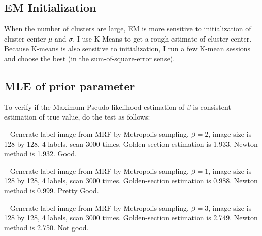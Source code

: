 \documentclass{article}
\begin{document}
\subsection{EM Initialization}
When the number of clusters are large, EM is more sensitive to initialization of cluster center $\mu$ and $\sigma$. I use K-Means to get a rough estimate of cluster center. Because K-means is also sensitive to initialization, I run a few K-mean sessions and choose the best (in the sum-of-square-error sense).

\subsection{MLE of prior parameter}
To verify if the Maximum  Pseudo-likelihood estimation of $\beta$ is consistent estimation of true value, do the test as follows:

-- Generate label image from MRF by Metropolis sampling. $\beta = 2$, image size is 128 by 128, 4 labels, scan 3000 times. Golden-section estimation is 1.933. Newton method is 1.932. Good. 

-- Generate label image from MRF by Metropolis sampling. $\beta = 1$, image size is 128 by 128, 4 labels, scan 3000 times. Golden-section estimation is 0.988. Newton method is 0.999. Pretty Good. 

-- Generate label image from MRF by Metropolis sampling. $\beta = 3$, image size is 128 by 128, 4 labels, scan 3000 times. Golden-section estimation is 2.749. Newton method is 2.750. Not good.
\end{document}
